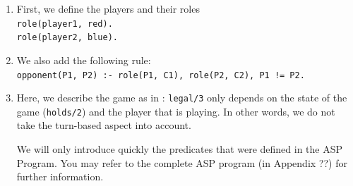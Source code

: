 \documentclass[12pt,twoside]{report}
\begin{document}
\begin{enumerate}
\item First, we define the players and their roles\\
\texttt{role(player1, red).\\
role(player2, blue).\\}

\item We also add the following rule:\\
\texttt{opponent(P1, P2) :- role(P1, C1), role(P2, C2), P1 != P2.}

\item Here, we describe the game as in \cite{thielscher2009answer}: \texttt{legal/3} only depends on the state of the game (\texttt{holds/2}) and the player that is playing. In other words, we do not take the turn-based aspect into account.

\smallskip

We will only introduce quickly the predicates that were defined in the ASP Program. You may refer to the complete ASP program (in Appendix ??) for further information. 


\end{enumerate}
\end{document}
